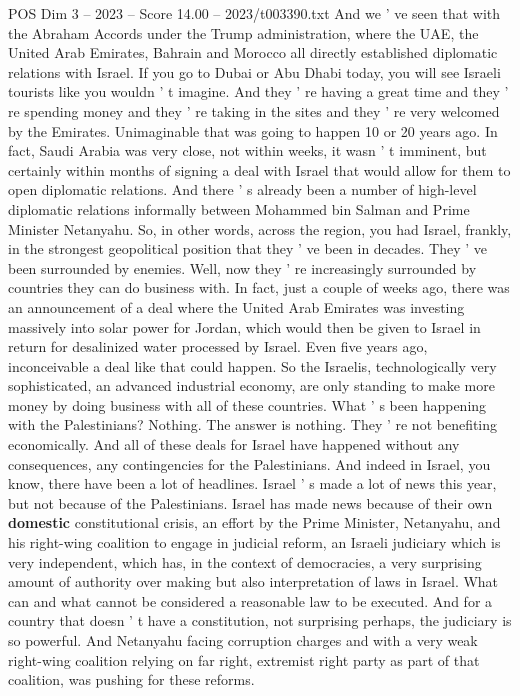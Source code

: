 \begin{textsample}{POS Dim 3 – 2023 – Score 14.00 – 2023/t003390.txt}
And we ' ve seen that with the Abraham Accords under the Trump administration, where the UAE, the United Arab Emirates, Bahrain and Morocco all directly established diplomatic relations with Israel.
If you go to Dubai or Abu Dhabi today, you will see Israeli tourists like you wouldn ' t imagine.
And they ' re having a great time and they ' re spending money and they ' re taking in the sites and they ' re very welcomed by the Emirates.
Unimaginable that was going to happen 10 or 20 years ago.
In fact, Saudi Arabia was very close, not within weeks, it wasn ' t imminent, but certainly within months of signing a deal with Israel that would allow for them to open diplomatic relations.
And there ' s already been a number of high-level diplomatic relations informally between Mohammed bin Salman and Prime Minister Netanyahu.
So, in other words, across the region, you had Israel, frankly, in the strongest geopolitical position that they ' ve been in decades.
They ' ve been surrounded by enemies.
Well, now they ' re increasingly surrounded by countries they can do business with.
In fact, just a couple of weeks ago, there was an announcement of a deal where the United Arab Emirates was investing massively into solar power for Jordan, which would then be given to Israel in return for desalinized water processed by Israel.
Even five years ago, inconceivable a deal like that could happen.
So the Israelis, technologically very sophisticated, an advanced industrial economy, are only standing to make more money by doing business with all of these countries.
What ' s been happening with the Palestinians?
Nothing.
The answer is nothing.
They ' re not benefiting economically.
And all of these deals for Israel have happened without any consequences, any contingencies for the Palestinians.
And indeed in Israel, you know, there have been a lot of headlines.
Israel ' s made a lot of news this year, but not because of the Palestinians.
Israel has made news because of their own \textbf{domestic} constitutional crisis, an effort by the Prime Minister, Netanyahu, and his right-wing coalition to engage in judicial reform, an Israeli judiciary which is very independent, which has, in the context of democracies, a very surprising amount of authority over making but also interpretation of laws in Israel.
What can and what cannot be considered a reasonable law to be executed.
And for a country that doesn ' t have a constitution, not surprising perhaps, the judiciary is so powerful.
And Netanyahu facing corruption charges and with a very weak right-wing coalition relying on far right, extremist right party as part of that coalition, was pushing for these reforms.

\end{textsample}
